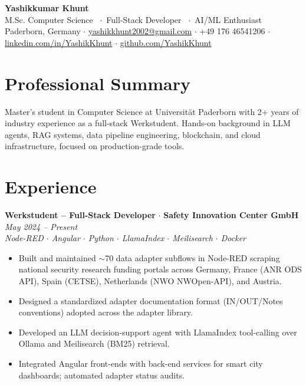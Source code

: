 \documentclass[a4paper,9pt]{extarticle}
\newcommand{\jobentry}[4]{%
	\vspace{2pt}\noindent%
	{\bfseries\color{black} #1} {\color{gray} $\cdot$ } {\bfseries\color{light} #2}%
	\hfill {\itshape\color{gray} #4}\\[1pt]%
	{\itshape\color{gray}\small #3}\par\vspace{1pt}%
}
\begin{document}
	
	{\fontsize{26}{30}\selectfont\bfseries\color{accent} Yashikkumar Khunt}\\[4pt]
	{\color{gray}\normalsize M.Sc. Computer Science \ $\cdot$\ Full-Stack Developer \ $\cdot$\ AI/ML Enthusiast}\\[5pt]
	{\small\color{gray}%
		Paderborn, Germany \enspace$\cdot$\enspace
		\href{mailto:yashikkhunt2002@gmail.com}{yashikkhunt2002@gmail.com} \enspace$\cdot$\enspace
		+49 176 46541206 \enspace$\cdot$\enspace
		\href{https://linkedin.com/in/YashikKhunt}{linkedin.com/in/YashikKhunt} \enspace$\cdot$\enspace
		\href{https://github.com/YashikKhunt}{github.com/YashikKhunt}%
	}\\[3pt]
	{\color{accent}\titlerule[1.5pt]}
	
	\section{Professional Summary}
	\justifying
	Master's student in Computer Science at Universit\"at Paderborn with 2+ years of industry experience as a full-stack Werkstudent. Hands-on background in LLM agents, RAG systems, data pipeline engineering, blockchain, and cloud infrastructure, focused on production-grade tools.
	\RaggedRight
	
	\section{Experience}
	
	\jobentry{Werkstudent -- Full-Stack Developer}{Safety Innovation Center GmbH}{Node-RED $\cdot$ Angular $\cdot$ Python $\cdot$ LlamaIndex $\cdot$ Meilisearch $\cdot$ Docker}{May 2024 -- Present}
	\begin{itemize}
		\item Built and maintained $\sim$70 data adapter subflows in Node-RED scraping national security research funding portals across Germany, France (ANR ODS API), Spain (CETSE), Netherlands (NWO NWOpen-API), and Austria.
		\item Designed a standardized adapter documentation format (IN/OUT/Notes conventions) adopted across the adapter library.
		\item Developed an LLM decision-support agent with LlamaIndex tool-calling over Ollama and Meilisearch (BM25) retrieval.
		\item Integrated Angular front-ends with back-end services for smart city dashboards; automated adapter status audits.
	\end{itemize}
	
\end{document}
